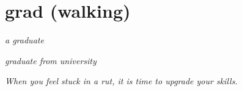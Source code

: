 \chapter{grad (walking)}

\begin{vocabulary}[graduate]
    \textit{a graduate}

    \textit{graduate from university}
\end{vocabulary}

\begin{vocabulary}[gradual]
\end{vocabulary}

\begin{vocabulary}[gradually]
\end{vocabulary}

\begin{vocabulary}[upgrade]
    \textit{When you feel stuck in a rut, it is time to upgrade your skills.}
\end{vocabulary}